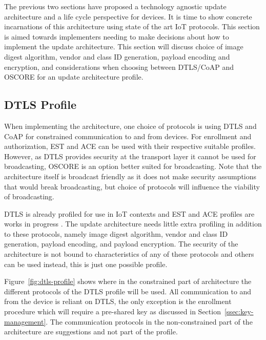 \documentclass[0-thesis.tex]{subfiles}
\begin{document}
\label{chap:profiles}
The previous two sections have proposed a technology agnostic update architecture and a
life cycle perspective for devices. It is time to show concrete incarnations of this
architecture using state of the art IoT protocols. This section is aimed towards
implementers needing to make decisions about how to implement the update architecture.
This section will discuss choice of image digest algorithm, vendor and class ID
generation, payload encoding and encryption, and considerations when choosing between
DTLS/CoAP and OSCORE for an update architecture profile.

\subsection{DTLS Profile}
\label{ssec:dtls-profile}
When implementing the architecture, one choice of protocols is using DTLS and CoAP for
constrained communication to and from devices. For enrollment and authorization, EST and
ACE can be used with their respective suitable profiles. However, as DTLS provides
security at the transport layer it cannot be used for broadcasting, OSCORE is an
option better suited for broadcasting. Note that the architecture itself is broadcast
friendly as it does not make security assumptions that would break broadcasting, but
choice of protocols will influence the viability of broadcasting.

DTLS is already profiled for use in IoT contexts and EST and ACE profiles are works in
progress \parencite{rfc7925, est-coaps, ace-dtls-profile}. The update architecture needs
little extra profiling in addition to these protocols, namely image digest algorithm,
vendor and class ID generation, payload encoding, and payload encryption. The security of
the architecture is not bound to characteristics of any of these protocols and others can
be used instead, this is just one possible profile.

Figure~\ref{fig:dtls-profile} shows where in the constrained part of architecture the
different protocols of the DTLS profile will be used. All communication to and from the
device is reliant on DTLS, the only exception is the enrollment procedure which will
require a pre-shared key as discussed in Section~\ref{ssec:key-management}. The
communication protocols in the non-constrained part of the architecture are suggestions
and not part of the profile.
\end{document}
